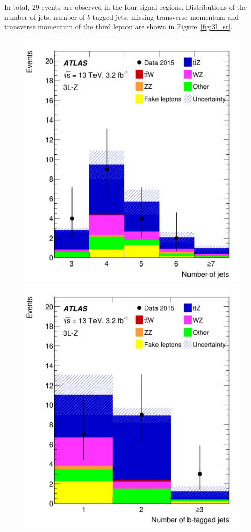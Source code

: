 In total, 29 events are observed in the four signal regions. Distributions of
the number of jets, number of $b$-tagged jets, missing transverse momentum and
transverse momentum of the third lepton are shown in Figure~\ref{fig:3l_sr}.

\begin{figure}[htbp]
\centering
\includegraphics[width=\twofigwidth]{SR3lZnJets}
\includegraphics[width=\twofigwidth]{SR3lZnBJets}

\end{figure}
